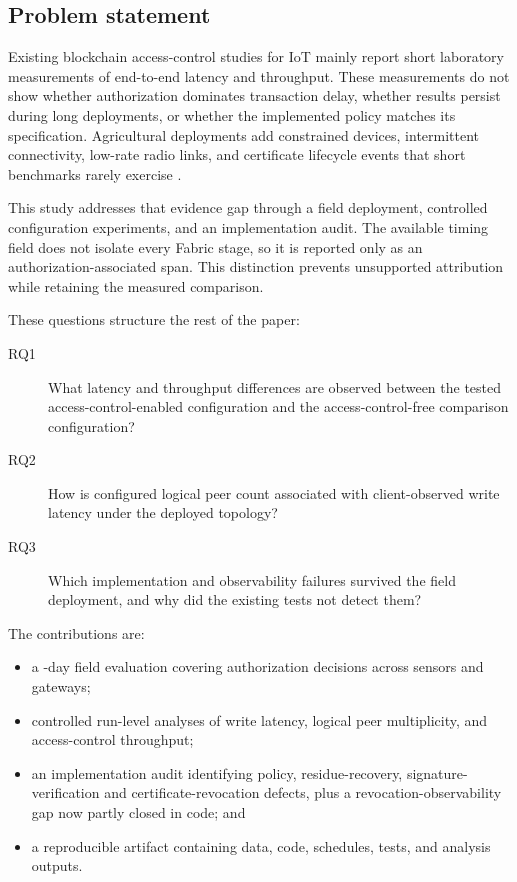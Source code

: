 \documentclass[a4paper,fleqn]{cas-sc}
\begin{document}
\subsection{Problem statement}
\label{subsec:problem}

Existing blockchain access-control studies for IoT mainly report short
laboratory measurements of end-to-end latency and throughput. These
measurements do not show whether authorization dominates transaction delay,
whether results persist during long deployments, or whether the implemented
policy matches its specification. Agricultural deployments add constrained
devices, intermittent connectivity, low-rate radio links, and certificate
lifecycle events that short benchmarks rarely exercise
\cite{abang2024latency,ferrag2020security,rustemi2025synergizing}.

This study addresses that evidence gap through a field deployment, controlled
configuration experiments, and an implementation audit. The available timing
field does not isolate every Fabric stage, so it is reported only as an
authorization-associated span. This distinction prevents unsupported
attribution while retaining the measured comparison.

These questions structure the rest of the paper:

\begin{description}
\item[RQ1] What latency and throughput differences are observed between the
  tested access-control-enabled configuration and the access-control-free
  comparison configuration?
\item[RQ2] How is configured logical peer count associated with
  client-observed write latency under the deployed topology?
\item[RQ3] Which implementation and observability failures survived the
  field deployment, and why did the existing tests not detect them?
\end{description}

The contributions are:
\begin{itemize}
\item a \DeployDays{}-day field evaluation covering \TotalDecisions{}
authorization decisions across \DeploySensors{} sensors and
\DeployGateways{} gateways;
\item controlled run-level analyses of write latency, logical peer
multiplicity, and access-control throughput;
\item an implementation audit identifying policy, residue-recovery,
signature-verification and certificate-revocation defects, plus a
revocation-observability gap now partly closed in code; and
\item a reproducible artifact containing data, code, schedules, tests, and
analysis outputs.
\end{itemize}
\end{document}
